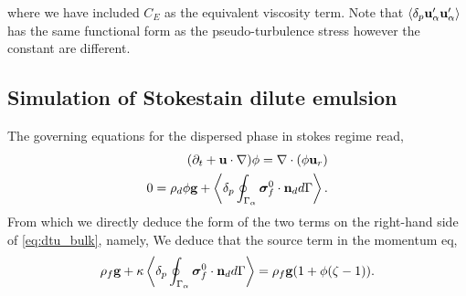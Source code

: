 where we have included $C_E$ as the equivalent viscosity term. 
Note that $\left<\delta_p \textbf{u}_\alpha'\textbf{u}_\alpha'\right>$ has the same functional form as the pseudo-turbulence stress however the constant are different. 
















\subsection{Simulation of Stokestain  dilute emulsion}

The governing equations for the dispersed phase in stokes regime read,
\begin{align}
    (\partial_t + \textbf{u} \cdot \mathbf{\nabla})\phi = \mathbf{\nabla}\cdot(\phi \textbf{u}_r)\\
    0 
    = 
    \rho_d \phi \textbf{g}
    + \left<\delta_p \oint_{\Gamma_{\alpha}} {\bm{\sigma}_f^0 \cdot \textbf{n}_d} d\Gamma\right>. 
\end{align}
From which we directly deduce the form of the two terms on the right-hand side of \ref{eq:dtu_bulk}, namely, 
We deduce that the source term in the momentum eq, 
\begin{equation*}
    \rho_f \textbf{g} 
    + \kappa
    \left<\delta_p \oint_{\Gamma_{\alpha}} {\bm{\sigma}_f^0 \cdot \textbf{n}_d} d\Gamma\right>
    = \rho_f \textbf{g}(1 + \phi(\zeta-1) ). 
\end{equation*}

